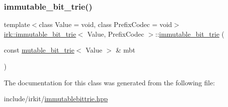 \subsubsection{\texorpdfstring{immutable\+\_\+bit\+\_\+trie()}{immutable\_bit\_trie()}}
{\footnotesize\ttfamily template$<$class Value  = void, class Prefix\+Codec  = void$>$ \\
\mbox{\hyperlink{classirk_1_1immutable__bit__trie}{irk\+::immutable\+\_\+bit\+\_\+trie}}$<$ Value, Prefix\+Codec $>$\+::\mbox{\hyperlink{classirk_1_1immutable__bit__trie}{immutable\+\_\+bit\+\_\+trie}} (\begin{DoxyParamCaption}\item[{const \mbox{\hyperlink{classirk_1_1mutable__bit__trie}{mutable\+\_\+bit\+\_\+trie}}$<$ Value $>$ \&}]{mbt }\end{DoxyParamCaption})\hspace{0.3cm}{\ttfamily [inline]}}



The documentation for this class was generated from the following file\+:\begin{DoxyCompactItemize}
\item 
include/irkit/\mbox{\hyperlink{immutablebittrie_8hpp}{immutablebittrie.\+hpp}}\end{DoxyCompactItemize}
